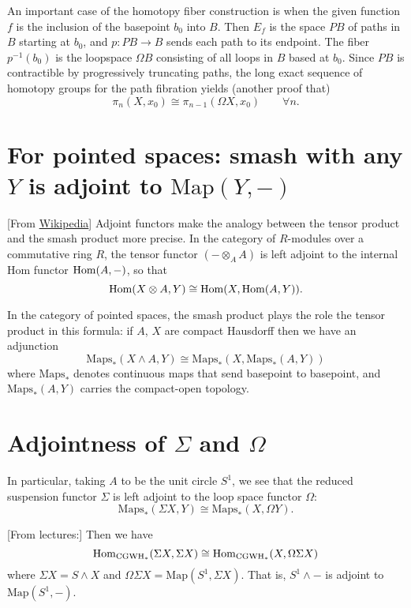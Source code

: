 \begin{definition}
An important case of the homotopy fiber construction 
is when the given function $f$ is the inclusion of the basepoint $b_0$ into $B$. 
Then $E_{f}$ is the space $PB$ of paths in $B$ starting at $b_{0}$,  
and $p:PB\to B$ sends each path to its endpoint. 
The fiber $p^{-1}(b_{0})$ is the loopspace $\Omega B$ 
consisting of all loops in  $B$ based at $b_{0}$. 
Since $PB$ is contractible by progressively truncating paths, 
the long exact sequence of homotopy groups for the path 
fibration yields (another proof that)
$$
\pi_{n}(X,x_{0})\cong \pi_{n-1}(\Omega X,x_{0})\qquad \forall n.
$$
\end{definition}

\section{For pointed spaces: smash with any \texorpdfstring{$Y$}{Y}
is adjoint to  \texorpdfstring{$\text{Map}(Y,-)$}{Map(Y,-)}}

[From \href{https://en.wikipedia.org/wiki/Smash_product#}{Wikipedia}] 
Adjoint functors make the analogy between the tensor product 
and the smash product more
precise. In the category of $R$-modules over a commutative ring $R$, the tensor
functor $(-\otimes_{A} A)$ is left adjoint to the internal Hom functor
$\mathop{\mathrm{Hom}}\nolimits(A,-)$, so that 
$$
\mathop{\mathrm{Hom}}\nolimits(X\otimes A,Y)\cong\mathop{\mathrm{Hom}}\nolimits(X,\mathop{\mathrm{Hom}}\nolimits(A,Y)).
$$

In the category of pointed spaces, the smash product plays the role the tensor product in this formula: if $A$, $X$ are compact Hausdorff then we have an adjunction
$$\text{Maps}_{*}(X\wedge A,Y)\cong \text{Maps}_{*}(X,\text{Maps}_{*}(A,Y))$$
where $\text{Maps}_{*}$ denotes continuous maps that send basepoint to basepoint, and $\text{Maps}_{*}(A,Y)$ carries the compact-open topology.

\section{Adjointness of \texorpdfstring{$\Sigma$}{Σ} and \texorpdfstring{$\Omega$}{Ω}}
In particular, taking $A$ to be the unit circle $S^{1}$, we see that the reduced suspension functor $\Sigma$ is left adjoint to the loop space functor $\Omega$:
$$\text{Maps}_{*}(\Sigma X,Y)\cong \text{Maps}_{*}(X,\Omega Y).$$

[From lectures:] Then we have
$$\mathop{\mathrm{Hom}}\nolimits_{\text{CGWH}_*}(\Sigma X,\Sigma X)\cong\mathop{\mathrm{Hom}}\nolimits_{\text{CGWH}_*}(X,\Omega\Sigma X)$$
where $\Sigma X=S\wedge X$ and $\Omega\Sigma X=\text{Map}(S^1,\Sigma X)$. That is, $S^1\wedge-$ is adjoint to $\text{Map}(S^1,-)$.

